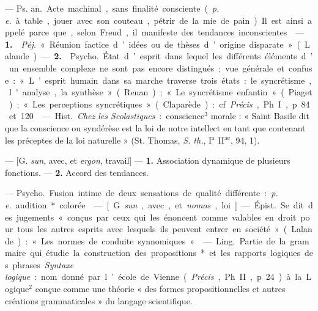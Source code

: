 \begin{itemize}[leftmargin=1cm, label=, itemsep=1pt]
 — \si{Ps. an.} Acte machinal, sans finalité
consciente ({\it p. e.} à table, jouer avec son couteau, pétrir de la mie de
pain). Il est ainsi appelé parce que, selon Freud, il manifeste des
tendances inconscientes.

 — {\bf 1.}  {\it Péj.} « Réunion factice
d’idées ou de thèses d’origine disparate » (Lalande). — {\bf 2.}
 \si{Psycho.} État d’esprit dans lequel les différents
éléments d’un ensemble complexe ne sont pas encore distingués; vue générale
et confuse : « L’esprit humain dans sa marche traverse trois états : le
syncrétisme, l'analyse, la synthèse » (Renan) ;
« Le syncrétisme enfantin » (Piaget) ; « Les perceptions syncrétiques
» (Claparède) : cf. {\it Précis}, Ph. I, p. 84 et 120.

 — \si{Hist.} {\it Chez les Scolastiques} : conscience$^3$
morale : « Saint Basile dit que la conscience ou syndérèse est la loi de
notre intellect en tant que contenant les préceptes de la loi naturelle
» (St. Thomas, {\it S. th.}, I$^\text{a}$ II$^\text{ae}$, 94, 1).

 — [G. {\it sun}, avec, et {\it ergon}, travail] — {\bf 1.}
Association dynamique de plusieurs fonctions. — {\bf 2.} Accord des
tendances.

 — \si{Psycho.} Fusion intime
de deux sensations de qualité différente : {\it p. e.} audition* colorée.

 — [G. {\it sun}, avec, et {\it nomos}, loi] — \si{Épist.} Se
dit des jugements « conçus par ceux qui les énoncent comme valables en droit
pour tous les autres esprits avec lesquels ils peuvent entrer en société
» (Lalande) : « Les normes de conduite synnomiques. »

 — \si{Ling.} Partie de la grammaire qui étudie la construction
des propositions* et les rapports logiques des phrases. {\it Syntaxe
logique} : nom donné par l’école de Vienne ({\it Précis}, Ph. II, p. 24) à la
Logique$^2$ conçue comme une théorie « des formes propositionnelles et autres
créations grammaticales » du langage scientifique.


\end{itemize}
